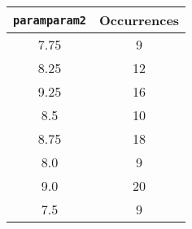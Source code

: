 \documentclass[letterpaper, 12pt]{article}
\begin{document}
\begin{longtable}{|c|c|}
\hline
\textbf{\texttt{paramparam2}} & \textbf{Occurrences} \\
\hline
7.75 & 9 \\
\hline
8.25 & 12 \\
\hline
9.25 & 16 \\
\hline
8.5 & 10 \\
\hline
8.75 & 18 \\
\hline
8.0 & 9 \\
\hline
9.0 & 20 \\
\hline
7.5 & 9 \\
\hline
\end{longtable}
\end{document}
